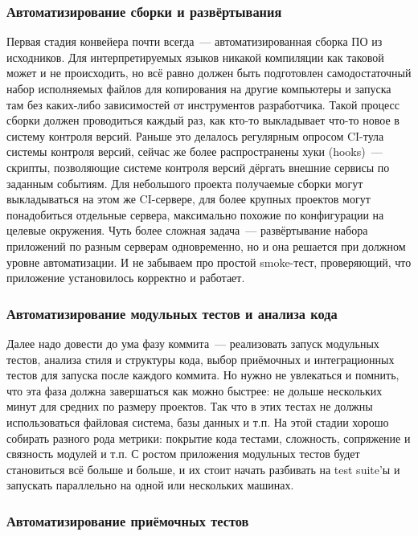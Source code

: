 \documentclass{../../text-style}
\begin{document}
\subsubsection{Автоматизирование сборки и развёртывания}

Первая стадия конвейера почти всегда~--- автоматизированная сборка ПО из исходников. Для интерпретируемых языков никакой компиляции как таковой может и не происходить, но всё равно должен быть подготовлен самодостаточный набор исполняемых файлов для копирования на другие компьютеры и запуска там без каких-либо зависимостей от инструментов разработчика. Такой процесс сборки должен проводиться каждый раз, как кто-то выкладывает что-то новое в систему контроля версий. Раньше это делалось регулярным опросом CI-тула системы контроля версий, сейчас же более распространены хуки (hooks)~--- скрипты, позволяющие системе контроля версий дёргать внешние сервисы по заданным событиям. Для небольшого проекта получаемые сборки могут выкладываться на этом же CI-сервере, для более крупных проектов могут понадобиться отдельные сервера, максимально похожие по конфигурации на целевые окружения. Чуть более сложная задача~--- развёртывание набора приложений по разным серверам одновременно, но и она решается при должном уровне автоматизации. И не забываем про простой smoke-тест, проверяющий, что приложение установилось корректно и работает.

\subsubsection{Автоматизирование модульных тестов и анализа кода}

Далее надо довести до ума фазу коммита~--- реализовать запуск модульных тестов, анализа стиля и структуры кода, выбор приёмочных и интеграционных тестов для запуска после каждого коммита. Но нужно не увлекаться и помнить, что эта фаза должна завершаться как можно быстрее: не дольше нескольких минут для средних по размеру проектов. Так что в этих тестах не должны использоваться файловая система, базы данных и т.п. На этой стадии хорошо собирать разного рода метрики: покрытие кода тестами, сложность, сопряжение и связность модулей и т.п. С ростом приложения модульных тестов будет становиться всё больше и больше, и их стоит начать разбивать на test suite’ы и запускать параллельно на одной или нескольких машинах.

\subsubsection{Автоматизирование приёмочных тестов}
\end{document}
